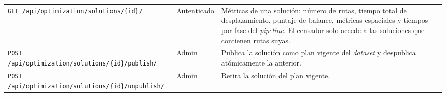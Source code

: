 \begin{table}[H]
\begin{tabularx}{\textwidth}{@{}p{5.5cm} p{1.9cm} X@{}}
    \texttt{GET \slash api\slash optimization\slash solutions\slash \{id\}\slash }         & Autenticado & Métricas de una solución: número de rutas, tiempo total de desplazamiento, puntaje de balance, métricas espaciales y tiempos por fase del \textit{pipeline}. El censador solo accede a las soluciones que contienen rutas suyas. \\
    \texttt{POST \slash api\slash optimization\slash solutions\slash \{id\}\slash publish\slash }   & Admin    & Publica la solución como plan vigente del \textit{dataset} y despublica atómicamente la anterior. \\
    \texttt{POST \slash api\slash optimization\slash solutions\slash \{id\}\slash unpublish\slash } & Admin    & Retira la solución del plan vigente. \\
    \bottomrule
  \end{tabularx}
\end{table}

